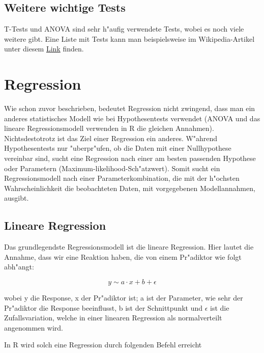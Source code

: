 \documentclass[a4paper,twoside]{tufte-book}\usepackage[]{graphicx}\usepackage[]{color}
\begin{document}
\subsection{Weitere wichtige Tests}

T-Tests und ANOVA sind sehr h"aufig verwendete Tests, wobei es noch viele weitere gibt. Eine Liste mit Tests kann man beispielsweise im Wikipedia-Artikel unter diesem \href{http://en.wikipedia.org/wiki/Category:Statistical_tests}{Link} finden.


\section{Regression}

Wie schon zuvor beschrieben, bedeutet Regression nicht zwingend, dass man ein anderes statistisches Modell wie bei Hypothesentests verwendet (ANOVA und das lineare Regressionsmodell verwenden in R die gleichen Annahmen). Nichtsdestotrotz ist das Ziel einer Regression ein anderes. W"ahrend Hypothesentests nur "uberpr"ufen, ob die Daten mit einer Nullhypothese vereinbar sind, sucht eine Regression nach einer am besten passenden Hypothese oder Parametern (Maximum-likelihood-Sch"atzwert). Somit sucht ein Regressionsmodell nach einer Parameterkombination, die mit der h"ochsten Wahrscheinlichkeit die beobachteten Daten, mit vorgegebenen Modellannahmen, ausgibt.

\subsection{Lineare Regression}

Das grundlegendste Regressionsmodell ist die lineare Regression. Hier lautet die Annahme, dass wir eine Reaktion haben, die von einem Pr"adiktor wie folgt abh"angt:

\begin{equation} \label{eq: linear regression}
y \sim a \cdot x + b + \epsilon 
\end{equation}

wobei y die Response, x der Pr"adiktor ist; a ist der Parameter, wie sehr der Pr"adiktor die Response beeinflusst, b ist der Schnittpunkt und $\epsilon$ ist die Zufallsvariation, welche in einer linearen Regression als normalverteilt angenommen wird.

In R wird solch eine Regression durch folgenden Befehl erreicht
\end{document}
